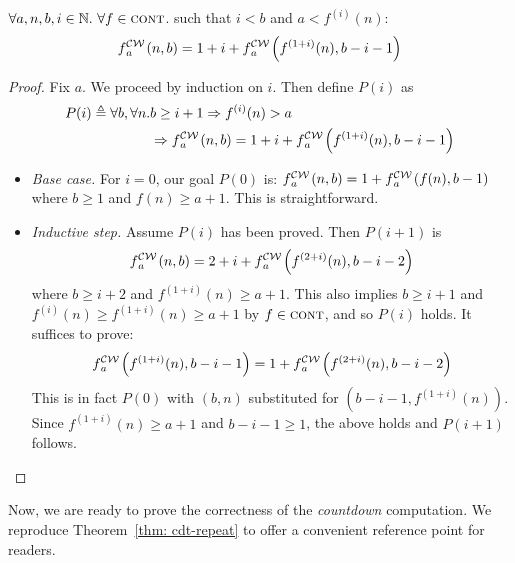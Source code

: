 \begin{lem} \label{lem: cdt-intermediate}
	$\forall a, n, b, i \in \mathbb{N}.~\forall f \in \text{\scshape{cont}}$. such that $i < b$ and $a < f^{(i)}(n)$:~
	\begin{equation}  \label{eq: cdt-intermediate}
	\cdw{f}{a}(n, b) = 1 + i + \cdw{f}{a}\left(f^{(1+i)}(n), b - i - 1\right)
	\end{equation}
\end{lem}

\begin{proof}
	Fix $a$. We proceed by induction on $i$. Then define $P(i)$ as
	\begin{equation*}
	\begin{aligned}
	P(i) \triangleq \forall b, \forall n. & b\ge i+1 \Rightarrow f^{(i)}(n) > a\\
	 & \Rightarrow \cdw{f}{a}(n, b) = 1 + i + \cdw{f}{a}\left(f^{(1+i)}(n), b - i - 1\right)
	\end{aligned}
	\end{equation*}
	\begin{itemize}[leftmargin=*]
		\item \textit{Base case.} For $i = 0$, our goal $P(0)$ is:
		$\cdw{f}{a}(n, b) = 1 + \cdw{f}{a}\left(f(n), b - 1\right)$
		where $b \ge 1$ and $f(n)\ge a+1$. This is straightforward.
		\item \textit{Inductive step.} Assume $P(i)$ has been proved. Then $P(i+1)$ is
		\begin{equation*}
		\cdw{f}{a}(n, b) = 2 + i + \cdw{f}{a}\left( f^{(2+i)}(n), b - i - 2 \right)
		\end{equation*}
		where $b \ge i+2$ and $f^{(1+i)}(n) \ge a+1$. This also implies $b\ge i+1$ and $\displaystyle f^{(i)}(n) \ge f^{(1+i)}(n)\ge a+1$ by $f\in \text{\scshape{cont}}$, and so $P(i)$ holds. It suffices to prove:
		\begin{equation*}
		\cdw{f}{a}\left(f^{(1+i)}(n), b-i-1\right) = 1 + \cdw{f}{a}\left( f^{(2+i)}(n), b-i-2 \right)
		\end{equation*}
		This is in fact $P(0)$ with $(b, n)$ substituted for $\left(b-i-1, f^{(1+i)}(n)\right)$. Since $f^{(1+i)}(n) \ge a+1$ and $b-i-1\ge 1$, the above holds and $P(i+1)$ follows.
	\end{itemize}
\end{proof}

Now, we are ready to prove the correctness of the \emph{countdown} computation. We reproduce Theorem~\ref{thm: cdt-repeat} to offer a convenient reference point for readers.

